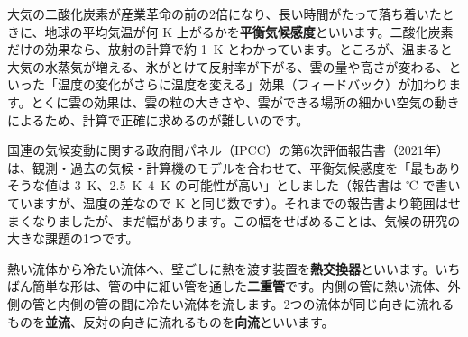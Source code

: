 \begin{phmada}
大気の二酸化炭素が産業革命の前の2倍になり、長い時間がたって落ち着いたときに、地球の平均気温が何 K 上がるかを\textbf{平衡気候感度}といいます。二酸化炭素だけの効果なら、放射の計算で約 \qty{1}{K} とわかっています。ところが、温まると大気の水蒸気が増える、氷がとけて反射率が下がる、雲の量や高さが変わる、といった「温度の変化がさらに温度を変える」効果（フィードバック）が加わります。とくに雲の効果は、雲の粒の大きさや、雲ができる場所の細かい空気の動きによるため、計算で正確に求めるのが難しいのです。

国連の気候変動に関する政府間パネル（IPCC）の第6次評価報告書（2021年）は、観測・過去の気候・計算機のモデルを合わせて、平衡気候感度を「最もありそうな値は \qty{3}{K}、\qtyrange{2.5}{4}{K} の可能性が高い」としました（報告書は ℃ で書いていますが、温度の差なので K と同じ数です）。それまでの報告書より範囲はせまくなりましたが、まだ幅があります。この幅をせばめることは、気候の研究の大きな課題の1つです。
\end{phmada}


\leavevmode\label{ph:熱-13:sec8}熱い流体から冷たい流体へ、壁ごしに熱を渡す装置を\textbf{熱交換器}といいます。いちばん簡単な形は、管の中に細い管を通した\textbf{二重管}です。内側の管に熱い流体、外側の管と内側の管の間に冷たい流体を流します。2つの流体が同じ向きに流れるものを\textbf{並流}、反対の向きに流れるものを\textbf{向流}といいます。

